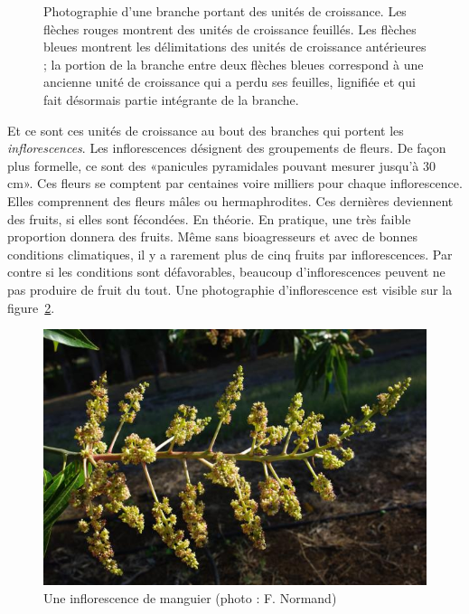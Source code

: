 \begin{figure}[ht]
 \caption{Photographie d'une branche portant des unités de croissance. Les flèches rouges montrent des unités de croissance feuillés. Les flèches bleues montrent les délimitations des unités de croissance antérieures ; la portion de la branche entre deux flèches bleues correspond à une ancienne unité de croissance qui a perdu ses feuilles, lignifiée et qui fait désormais partie intégrante de la branche.}
 \label{fig:uc}
\end{figure}


\newpage

Et ce sont ces unités de croissance au bout des branches qui portent les \emph{inflorescences}.
Les inflorescences désignent des groupements de fleurs. De façon plus formelle, ce sont des «panicules pyramidales pouvant mesurer jusqu’à 30 cm».
Ces fleurs se comptent par centaines voire milliers pour chaque inflorescence. 
Elles comprennent des fleurs mâles ou hermaphrodites.
Ces dernières deviennent des fruits, si elles sont fécondées.
En théorie.
En pratique, une très faible proportion donnera des fruits.
Même sans bioagresseurs et avec de bonnes conditions climatiques, il y a rarement plus de cinq fruits par inflorescences.
Par contre si les conditions sont défavorables, beaucoup d'inflorescences peuvent ne pas produire de fruit du tout.
Une photographie d'inflorescence est visible sur la figure~\ref{fig:inflo}.

\begin{figure}[ht]
 \centering
\includegraphics[scale = 0.64]{photos/inflo3.jpg}
 \caption{Une inflorescence de manguier (photo : F. Normand)}
 \label{fig:inflo}
\end{figure}





